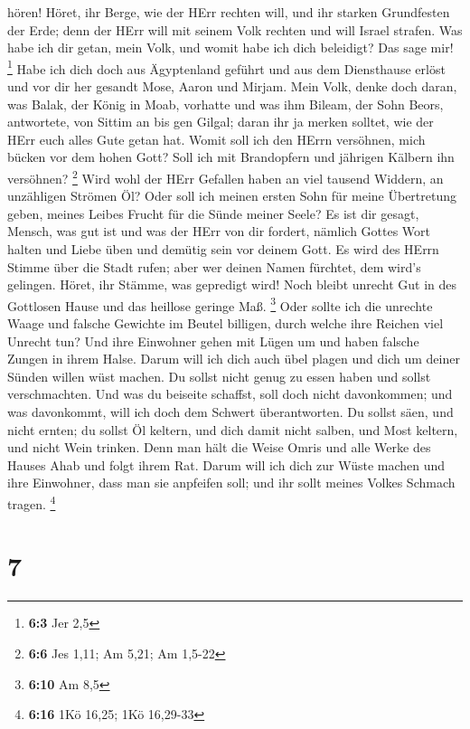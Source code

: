 hören!  Höret, ihr Berge, wie der HErr rechten will, und ihr
starken Grundfesten der Erde; denn der HErr will mit seinem Volk rechten
und will Israel strafen.  Was habe ich dir getan, mein Volk,
und womit habe ich dich beleidigt? Das sage mir! \footnote{\textbf{6:3}
  Jer 2,5}  Habe ich dich doch aus Ägyptenland geführt und
aus dem Diensthause erlöst und vor dir her gesandt Mose, Aaron und
Mirjam.  Mein Volk, denke doch daran, was Balak, der König
in Moab, vorhatte und was ihm Bileam, der Sohn Beors, antwortete, von
Sittim an bis gen Gilgal; daran ihr ja merken solltet, wie der HErr euch
alles Gute getan hat.  Womit soll ich den HErrn versöhnen,
mich bücken vor dem hohen Gott? Soll ich mit Brandopfern und jährigen
Kälbern ihn versöhnen? \footnote{\textbf{6:6} Jes 1,11; Am 5,21; Am
  1,5-22}  Wird wohl der HErr Gefallen haben an viel tausend
Widdern, an unzähligen Strömen Öl? Oder soll ich meinen ersten Sohn für
meine Übertretung geben, meines Leibes Frucht für die Sünde meiner
Seele?  Es ist dir gesagt, Mensch, was gut ist und was der
HErr von dir fordert, nämlich Gottes Wort halten und Liebe üben und
demütig sein vor deinem Gott.  Es wird des HErrn Stimme über
die Stadt rufen; aber wer deinen Namen fürchtet, dem wird's gelingen.
Höret, ihr Stämme, was gepredigt wird!  Noch bleibt unrecht
Gut in des Gottlosen Hause und das heillose geringe Maß. \footnote{\textbf{6:10}
  Am 8,5}  Oder sollte ich die unrechte Waage und falsche
Gewichte im Beutel billigen,  durch welche ihre Reichen
viel Unrecht tun? Und ihre Einwohner gehen mit Lügen um und haben
falsche Zungen in ihrem Halse.  Darum will ich dich auch
übel plagen und dich um deiner Sünden willen wüst machen. 
Du sollst nicht genug zu essen haben und sollst verschmachten. Und was
du beiseite schaffst, soll doch nicht davonkommen; und was davonkommt,
will ich doch dem Schwert überantworten.  Du sollst säen,
und nicht ernten; du sollst Öl keltern, und dich damit nicht salben, und
Most keltern, und nicht Wein trinken.  Denn man hält die
Weise Omris und alle Werke des Hauses Ahab und folgt ihrem Rat. Darum
will ich dich zur Wüste machen und ihre Einwohner, dass man sie
anpfeifen soll; und ihr sollt meines Volkes Schmach tragen. \footnote{\textbf{6:16}
  1Kö 16,25; 1Kö 16,29-33}

\hypertarget{section-3}{%
\section{7}\label{section-3}}

